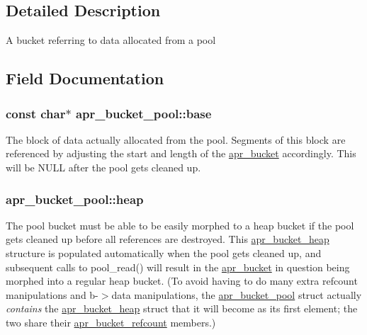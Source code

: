 \subsection{Detailed Description}
A bucket referring to data allocated from a pool 

\subsection{Field Documentation}
\subsubsection[{\texorpdfstring{base}{base}}]{\setlength{\rightskip}{0pt plus 5cm}const char$\ast$ apr\+\_\+bucket\+\_\+pool\+::base}\hypertarget{structapr__bucket__pool_a9ee5297361ba548a20c3aa626a37c068}{}\label{structapr__bucket__pool_a9ee5297361ba548a20c3aa626a37c068}
The block of data actually allocated from the pool. Segments of this block are referenced by adjusting the start and length of the \hyperlink{structapr__bucket}{apr\+\_\+bucket} accordingly. This will be N\+U\+LL after the pool gets cleaned up. 
\subsubsection[{\texorpdfstring{heap}{heap}}]{ apr\+\_\+bucket\+\_\+pool\+::heap}\hypertarget{structapr__bucket__pool_a0fe0b0dedea28fb1ed0a1a0f42338225}{}\label{structapr__bucket__pool_a0fe0b0dedea28fb1ed0a1a0f42338225}
The pool bucket must be able to be easily morphed to a heap bucket if the pool gets cleaned up before all references are destroyed. This \hyperlink{structapr__bucket__heap}{apr\+\_\+bucket\+\_\+heap} structure is populated automatically when the pool gets cleaned up, and subsequent calls to pool\+\_\+read() will result in the \hyperlink{structapr__bucket}{apr\+\_\+bucket} in question being morphed into a regular heap bucket. (To avoid having to do many extra refcount manipulations and b-\/$>$data manipulations, the \hyperlink{structapr__bucket__pool}{apr\+\_\+bucket\+\_\+pool} struct actually {\itshape contains} the \hyperlink{structapr__bucket__heap}{apr\+\_\+bucket\+\_\+heap} struct that it will become as its first element; the two share their \hyperlink{structapr__bucket__refcount}{apr\+\_\+bucket\+\_\+refcount} members.) 
